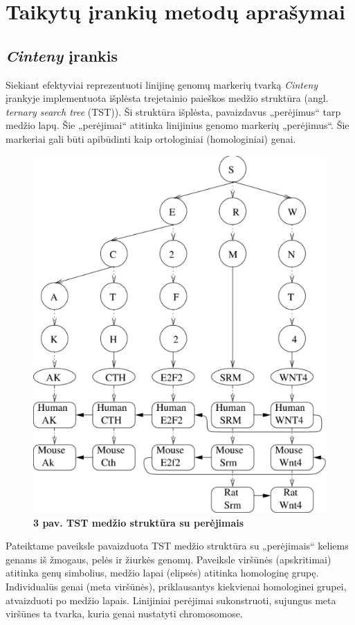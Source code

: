 \documentclass[12pt]{article}
\begin{document}
\newpage


\section{Taikytų įrankių metodų aprašymai}
\subsection{\emph{Cinteny} įrankis}
Siekiant efektyviai reprezentuoti linijinę genomų markerių tvarką
\emph{Cinteny}\cite{CINTENY} įrankyje
implementuota išplėsta trejetainio paieškos medžio struktūra\cite{TST} (angl.
\emph{ternary search tree} (TST)). Ši struktūra išplėsta, pavaizdavus 
„perėjimus“ tarp medžio lapų. Šie „perėjimai“ atitinka linijinius genomo
markerių „perėjimus“. Šie markeriai gali būti apibūdinti kaip ortologiniai
(homologiniai) genai.

\begin{figure}[htb]
    \begin{center}
        \includegraphics[width=0.4\linewidth]{../Figures/TTS_data_structure.png}
        \vspace{-0.5\baselineskip}
        \caption*{\small\textbf{3 pav. TST medžio struktūra su perėjimais}}
        \label{fig:3}
    \end{center}
\end{figure}

Pateiktame paveiksle pavaizduota TST medžio struktūra su „perėjimais“ keliems
genams iš žmogaus, pelės ir žiurkės genomų. Paveiksle viršūnės (apskritimai)
atitinka genų simbolius, medžio lapai (elipsės) atitinka homologinę grupę.
Individualūs genai (meta viršūnės), priklausantys kiekvienai homologinei grupei,
atvaizduoti po medžio lapais. Linijiniai perėjimai sukonstruoti, sujungus meta
viršūnes ta tvarka, kuria genai nustatyti chromosomose.
\end{document}
